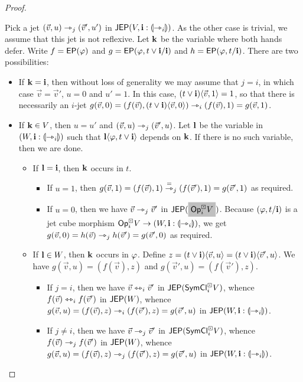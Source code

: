 \documentclass[a4paper]{memoir}
\begin{document}
\begin{proof}
\begin{itemize}
		Pick a jet $(\vec v, u) \rightarrowtriangle_j (\vec v', u')$ in $\mathsf{JEP}(V, \mathbf{i} : {\llparenthesis \rightarrowtriangle_i \rrparenthesis})$.
		As the other case is trivial, we assume that this jet is not reflexive.
		Let $\mathbf{k}$ be the variable where both hands defer.
		Write $f = \mathsf{EP}(\varphi)$ and $g = \mathsf{EP}(\varphi, t \vee \mathbf{i} / \mathbf{i})$ and $h = \mathsf{EP}(\varphi, t / \mathbf{i})$.
		There are two possibilities:
		\begin{itemize}
			\item If $\mathbf{k} = \mathbf{i}$, then without loss of generality we may assume that $j = i$, in which case $\vec v = \vec v'$, $u = 0$ and $u' = 1$.
			In this case, $(t \vee \mathbf{i}) \langle \vec v, 1 \rangle = 1$, so that there is necessarily an $i$-jet $g(\vec v, 0) = (f(\vec v), (t \vee \mathbf{i}) \langle \vec v, 0 \rangle) \rightarrowtriangle_i (f(\vec v), 1) = g(\vec v, 1)$.
			\item If $\mathbf{k} \in V$, then $u = u'$ and $(\vec v, u) \rightarrowtriangle_j (\vec v', u)$. Let $\mathbf{l}$ be the variable in $(W, \mathbf{i} : {\llparenthesis \rightarrowtriangle_i \rrparenthesis})$ such that $\mathbf{l} \langle \varphi, t \vee \mathbf{i} \rangle$ depends on $\mathbf{k}$.
			If there is no such variable, then we are done.
			\begin{itemize}
				\item If $\mathbf{l} = \mathbf{i}$, then $\mathbf{k}$ occurs in $t$.
				\begin{itemize}
					\item If $u = 1$, then $g(\vec v, 1) = (f(\vec v), 1) \overset{=}{\rightarrowtriangle}_j (f(\vec v'), 1) = g(\vec v', 1)$ as required.
					\item If $u = 0$, then we have $\vec v \rightarrowtriangle_j \vec v'$ in $\JEP(\mathemph{\Opcube_i V})$.
					Because $(\varphi, t / \mathbf{i})$ is a jet cube morphism ${\mathsf{Op}}^\boxdot_i V \to (W, \mathbf{i} : {\llparenthesis \rightarrowtriangle_i \rrparenthesis})$, we get
					$g(\vec v, 0) = h(\vec v) \rightarrowtriangle_j h(\vec v') = g(\vec v', 0)$ as required.
				\end{itemize}
				\item If $\mathbf{l} \in W$, then $\mathbf{k}$ occurs in $\varphi$.
				Define $z = (t \vee \mathbf{i}) \langle \vec v, u \rangle = (t \vee \mathbf{i}) \langle \vec v', u \rangle$.
				We have $g(\vec v, u) = (f(\vec v), z)$ and $g(\vec v', u) = (f(\vec v'), z)$.
				\begin{itemize}
					\item If $j = i$, then we have $\vec v \leftrightarrowtriangle_i \vec v'$ in $\mathsf{JEP}(\mathsf{SymCl}^\boxdot_i V)$, whence $f(\vec v) \leftrightarrowtriangle_i f(\vec v')$ in $\mathsf{JEP}(W)$, whence $g(\vec v, u) = (f(\vec v), z) \rightarrowtriangle_i (f(\vec v'), z) = g(\vec v', u)$ in $\mathsf{JEP}(W, \mathbf{i} : {\llparenthesis \rightarrowtriangle_i \rrparenthesis})$.
					\item If $j \neq i$, then we have $\vec v \rightarrowtriangle_j \vec v'$ in $\mathsf{JEP}(\mathsf{SymCl}^\boxdot_i V)$, whence $f(\vec v) \rightarrowtriangle_j f(\vec v')$ in $\mathsf{JEP}(W)$, whence $g(\vec v, u) = (f(\vec v), z) \rightarrowtriangle_j (f(\vec v'), z) = g(\vec v', u)$ in $\mathsf{JEP}(W, \mathbf{i} : {\llparenthesis \rightarrowtriangle_i \rrparenthesis})$.

\end{itemize}
\end{itemize}
\end{itemize}
\end{itemize}
\end{proof}
\end{document}
